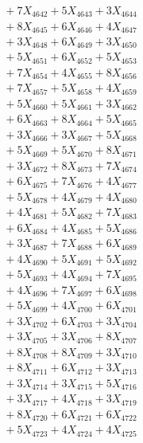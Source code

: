 \documentclass[a4paper,10pt]{article}
\begin{document}
{\begin{align}
&\;  + 7 X_{4642} + 5 X_{4643} + 3 X_{4644} \\[0.3ex]
&\;  + 8 X_{4645} + 6 X_{4646} + 4 X_{4647} \\[0.3ex]
&\;  + 3 X_{4648} + 6 X_{4649} + 3 X_{4650} \\[0.3ex]
&\;  + 5 X_{4651} + 6 X_{4652} + 5 X_{4653} \\[0.3ex]
&\;  + 7 X_{4654} + 4 X_{4655} + 8 X_{4656} \\[0.3ex]
&\;  + 7 X_{4657} + 5 X_{4658} + 4 X_{4659} \\[0.5ex]\allowbreak
&\;  + 5 X_{4660} + 5 X_{4661} + 3 X_{4662} \\[0.3ex]
&\;  + 6 X_{4663} + 8 X_{4664} + 5 X_{4665} \\[0.3ex]
&\;  + 3 X_{4666} + 3 X_{4667} + 5 X_{4668} \\[0.3ex]
&\;  + 5 X_{4669} + 5 X_{4670} + 8 X_{4671} \\[0.3ex]
&\;  + 3 X_{4672} + 8 X_{4673} + 7 X_{4674} \\[0.3ex]
&\;  + 6 X_{4675} + 7 X_{4676} + 4 X_{4677} \\[0.3ex]
&\;  + 5 X_{4678} + 4 X_{4679} + 4 X_{4680} \\[0.3ex]
&\;  + 4 X_{4681} + 5 X_{4682} + 7 X_{4683} \\[0.3ex]
&\;  + 6 X_{4684} + 4 X_{4685} + 5 X_{4686} \\[0.3ex]
&\;  + 3 X_{4687} + 7 X_{4688} + 6 X_{4689} \\[0.5ex]\allowbreak
&\;  + 4 X_{4690} + 5 X_{4691} + 5 X_{4692} \\[0.3ex]
&\;  + 5 X_{4693} + 4 X_{4694} + 7 X_{4695} \\[0.3ex]
&\;  + 4 X_{4696} + 7 X_{4697} + 6 X_{4698} \\[0.3ex]
&\;  + 5 X_{4699} + 4 X_{4700} + 6 X_{4701} \\[0.3ex]
&\;  + 3 X_{4702} + 6 X_{4703} + 3 X_{4704} \\[0.3ex]
&\;  + 3 X_{4705} + 3 X_{4706} + 8 X_{4707} \\[0.3ex]
&\;  + 8 X_{4708} + 8 X_{4709} + 3 X_{4710} \\[0.3ex]
&\;  + 8 X_{4711} + 6 X_{4712} + 3 X_{4713} \\[0.3ex]
&\;  + 3 X_{4714} + 3 X_{4715} + 5 X_{4716} \\[0.3ex]
&\;  + 3 X_{4717} + 4 X_{4718} + 3 X_{4719} \\[0.5ex]\allowbreak
&\;  + 8 X_{4720} + 6 X_{4721} + 6 X_{4722} \\[0.3ex]
&\;  + 5 X_{4723} + 4 X_{4724} + 4 X_{4725} \\[0.3ex]

\end{align}}
\end{document}
